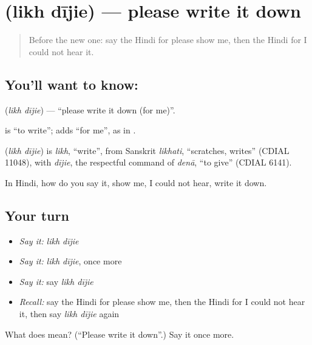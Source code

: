\section[\texorpdfstring{\hi{लिख} \hi{दीजिए} (likh dījie)}{लिख दीजिए (likh dījie)}]{  (likh dījie) — please write it down}

\label{lesson:HI-C111-likhdijie}



\begin{quote}
Before the new one: say the Hindi for please show me, then the Hindi for I could not hear it.
\end{quote}

\subsection*{You'll want to know:  }
\textbf{ } (\emph{likh dījie}) — \textquotedblleft{}please write it down (for me)\textquotedblright{}.

\textbf{} is \textquotedblleft{}to write\textquotedblright{}; \textbf{} adds \textquotedblleft{}for me\textquotedblright{}, as in \textbf{  }.

\begin{cousinweb}
\textbf{ } (\emph{likh dījie}) is \emph{likh}, \textquotedblleft{}write\textquotedblright{}, from Sanskrit \emph{likhati}, \textquotedblleft{}scratches, writes\textquotedblright{} (CDIAL 11048), with \emph{dījie}, the respectful command of \emph{denā}, \textquotedblleft{}to give\textquotedblright{} (CDIAL 6141).
\end{cousinweb}

\begin{grammarlens}[title={What you've built}]
In Hindi, how do you say it, show me, I could not hear, write it down.
\end{grammarlens}

\subsection*{Your turn}
\begin{itemize}
\raggedright
  \item \emph{Say it:} \emph{likh dījie}
  \item \emph{Say it:} \emph{likh dījie}, once more
  \item \emph{Say it:} say \emph{likh dījie}
  \item \emph{Recall:} say the Hindi for please show me, then the Hindi for I could not hear it, then say \emph{likh dījie} again
\end{itemize}

\begin{tcolorbox}[breakable,colback=teal!4,colframe=teal!35!black,title={Before you move on}]
What does   mean? (\textquotedblleft{}Please write it down\textquotedblright{}.) Say it once more.
\end{tcolorbox}
